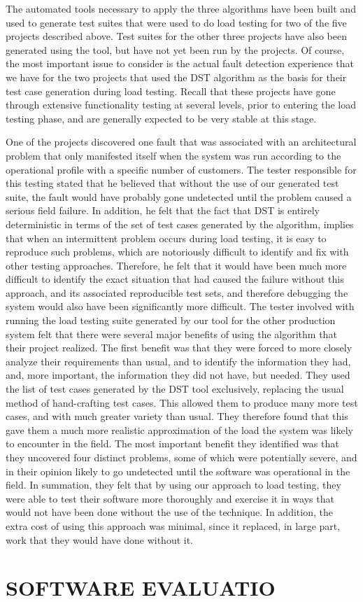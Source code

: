 \documentclass[journal, twoside]{IEEEtran}
\begin{document}
The automated tools necessary to apply the three algorithms
have been built and used to generate test suites that were used
to do load testing for two of the five projects described above.
Test suites for the other three projects have also been generated using the tool, but have not yet been run by the projects.
Of course, the most important issue to consider is the actual
fault detection experience that we have for the two projects
that used the DST algorithm as the basis for their test case
generation during load testing. Recall that these projects have
gone through extensive functionality testing at several levels,
prior to entering the load testing phase, and are generally expected to be very stable at this stage.

One of the projects discovered one fault that was associated
with an architectural problem that only manifested itself when
the system was run according to the operational profile with a
specific number of customers. The tester responsible for this
testing stated that he believed that without the use of our generated test suite, the fault would have probably gone undetected until the problem caused a serious field failure. In addition, he felt that the fact that DST is entirely deterministic in
terms of the set of test cases generated by the algorithm, implies that when an intermittent problem occurs during load
testing, it is easy to reproduce such problems, which are notoriously difficult to identify and fix with other testing approaches. Therefore, he felt that it would have been much
more difficult to identify the exact situation that had caused the
failure without this approach, and its associated reproducible
test sets, and therefore debugging the system would also have
been significantly more difficult. 
The tester involved with running the load testing suite generated by our tool for the other production system felt that
there were several major benefits of using the algorithm that
their project realized. The first benefit was that they were
forced to more closely analyze their requirements than usual,
and to identify the information they had, and, more important,
the information they did not have, but needed. They used the
list of test cases generated by the DST tool exclusively, replacing the usual method of hand-crafting test cases. This allowed
them to produce many more test cases, and with much greater
variety than usual. They therefore found that this gave them a
much more realistic approximation of the load the system was
likely to encounter in the field. The most important benefit
they identified was that they uncovered four distinct problems,
some of which were potentially severe, and in their opinion
likely to go undetected until the software was operational in
the field. In summation, they felt that by using our approach to
load testing, they were able to test their software more thoroughly and exercise it in ways that would not have been done
without the use of the technique. In addition, the extra cost of
using this approach was minimal, since it replaced, in large
part, work that they would have done without it. 

\section{SOFTWARE EVALUATIO}
\end{document}
